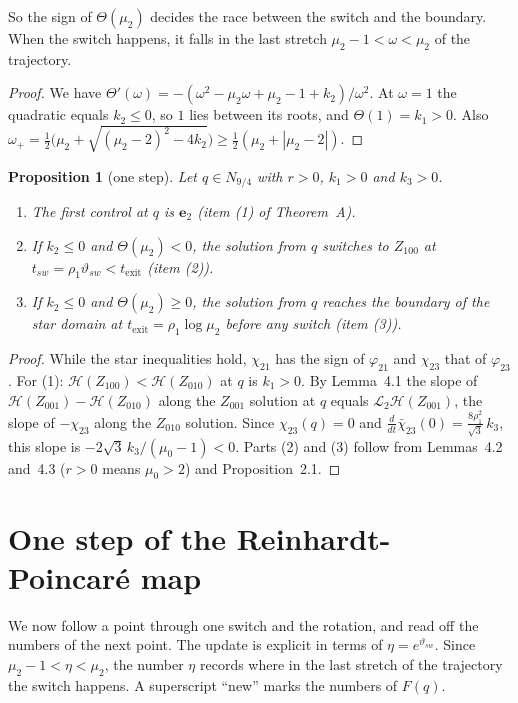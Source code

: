 \documentclass[11pt,a4paper]{article}
\theoremstyle{plain}
\newtheorem{proposition}[theorem]{Proposition}
\theoremstyle{definition}
\theoremstyle{remark}
\renewcommand{\H}{\mathcal{H}}
\newcommand{\ep}{\mathbf{e}}
\newcommand{\cl}{\bar\chi}
\newcommand{\sw}{_{sw}}
\newcommand{\tex}{t_{\mathrm{exit}}}
\begin{document}
So the sign of $\Theta(\mu_2)$ decides the race between the switch and the boundary. When the
switch happens, it falls in the last stretch $\mu_2-1<\omega<\mu_2$ of the trajectory.

\begin{proof}
We have $\Theta'(\omega)=-(\omega^2-\mu_2\omega+\mu_2-1+k_2)/\omega^2$. At $\omega=1$ the quadratic
equals $k_2\le0$, so $1$ lies between its roots, and $\Theta(1)=k_1>0$. Also
$\omega_+=\frac12\bigl(\mu_2+\sqrt{(\mu_2-2)^2-4k_2}\bigr)\ge\frac12(\mu_2+|\mu_2-2|)$.
\end{proof}

\begin{proposition}[one step]
Let $q\in N_{9/4}$ with $r>0$, $k_1>0$ and $k_3>0$.
\begin{enumerate}[label=\textup{(\arabic*)},itemsep=1pt]
\item The first control at $q$ is $\ep_2$ \textup{(}item \textup{(1)} of Theorem~A\textup{)}.
\item If $k_2\le0$ and $\Theta(\mu_2)<0$, the solution from $q$ switches to $Z_{100}$ at
$t\sw=\rho_1\vartheta\sw<\tex$ \textup{(}item \textup{(2)}\textup{)}.
\item If $k_2\le0$ and $\Theta(\mu_2)\ge0$, the solution from $q$ reaches the boundary of the star
domain at $\tex=\rho_1\log\mu_2$ before any switch \textup{(}item \textup{(3)}\textup{)}.
\end{enumerate}
\end{proposition}

\begin{proof}
While the star inequalities hold, $\chi_{21}$ has the sign of $\varphi_{21}$ and $\chi_{23}$ that
of $\varphi_{23}$. For (1): $\H(Z_{100})<\H(Z_{010})$ at $q$ is $k_1>0$. By Lemma~4.1 the slope of
$\H(Z_{001})-\H(Z_{010})$ along the $Z_{001}$ solution at $q$ equals $\mathcal L_2\H(Z_{001})$, the
slope of $-\chi_{23}$ along the $Z_{010}$ solution. Since $\chi_{23}(q)=0$ and
$\frac{d}{dt}\cl_{23}(0)=\frac{8\rho_1^2}{\sqrt3}\,k_3$, this slope is
$-2\sqrt3\,k_3/(\mu_0-1)<0$. Parts (2) and (3) follow from Lemmas~4.2 and~4.3 ($r>0$ means
$\mu_0>2$) and Proposition~2.1.
\end{proof}

\section{One step of the Reinhardt-Poincar\'e map}

We now follow a point through one switch and the rotation, and read off the numbers of the next
point. The update is explicit in terms of $\eta=e^{\vartheta\sw}$. Since $\mu_2-1<\eta<\mu_2$, the
number $\eta$ records where in the last stretch of the trajectory the switch happens. A superscript
``new'' marks the numbers of $F(q)$.
\end{document}
